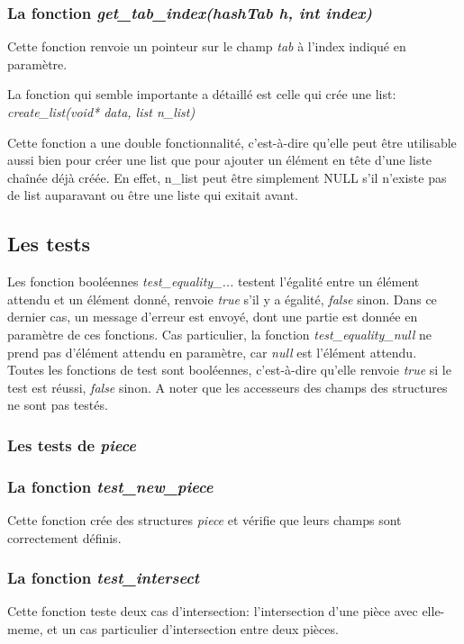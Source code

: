 \documentclass{report}
\begin{document}
\subsubsection*{La fonction \textit{get\_tab\_index(hashTab h, int index)}}
Cette fonction renvoie un pointeur sur le champ \textit{tab} à l'index indiqué en paramètre.

La fonction qui semble importante a détaillé est celle qui crée une list: \textit{create\_list(void* data, list n\_list)}

Cette fonction a une double fonctionnalité, c'est-à-dire qu'elle peut être utilisable aussi bien pour créer une list que pour ajouter un élément en tête d'une liste chaînée déjà créée. En effet, n\_list peut être simplement NULL s'il n'existe pas de list auparavant ou être une liste qui exitait avant. 

\subsection{Les tests}
Les fonction booléennes \textit{test\_equality\_...} testent l'égalité entre un élément attendu et un élément donné, renvoie \textit{true} s'il y a égalité, \textit{false} sinon. Dans ce dernier cas, un message d'erreur est envoyé, dont une partie est donnée en paramètre de ces fonctions. Cas particulier, la fonction \textit{test\_equality\_null} ne prend pas d'élément attendu en paramètre, car \textit{null} est l'élément attendu.\\
Toutes les fonctions de test sont booléennes, c'est-à-dire qu'elle renvoie \textit{true} si le test est réussi, \textit{false} sinon.
A noter que les accesseurs des champs des structures ne sont pas testés.
\subsubsection{Les tests de \textit{piece}}
\subsubsection*{La fonction \textit{test\_new\_piece}}
Cette fonction crée des structures \textit{piece} et vérifie que leurs champs sont correctement définis.
\subsubsection*{La fonction \textit{test\_intersect}}
Cette fonction teste deux cas d'intersection: l'intersection d'une pièce avec elle-meme, et un cas particulier d'intersection entre deux pièces.
\end{document}
